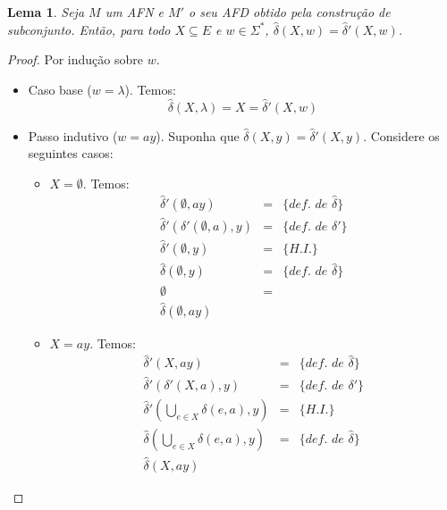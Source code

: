 \documentclass[a4paper]{article}
\newtheorem{Lemma}{Lema}
\theoremstyle{definition}
\begin{document}
  \begin{Lemma}\label{lemma1}
    Seja $M$ um AFN e $M'$ o seu AFD obtido pela construção de subconjunto.
    Então, para todo $X \subseteq E$ e $w \in \Sigma^*$,
    $\widehat{\delta}(X,w) = \widehat{\delta}'(X,w)$.
  \end{Lemma}
  \begin{proof}
    Por indução sobre $w$.
    \begin{itemize}
       \item Caso base ($w = \lambda$). Temos:
         \[\widehat{\delta}(X,\lambda) = X = \widehat{\delta}'(X,w)\]
       \item Passo indutivo ($w = ay$). Suponha que
         $\widehat{\delta}(X,y) = \widehat{\delta}'(X,y)$. Considere os
         seguintes casos:
         \begin{itemize}
            \item $X = \emptyset$. Temos:
              \[
                \begin{array}{lcl}
                  \widehat{\delta}'(\emptyset,ay) & = & \{\textit{def. de }\widehat{\delta}\}\\
                  \widehat{\delta}'(\delta'(\emptyset,a),y) & = & \{\textit{def.
                                                                  de
                                                                  }\delta'\}\\
                  \widehat{\delta}'(\emptyset,y) & = & \{H.I.\}\\
                  \widehat{\delta}(\emptyset,y) & = &\{\textit{def. de
                                                        }\widehat{\delta}\}\\
                  \emptyset & = & \\
                  \widehat{\delta}(\emptyset,ay)
                \end{array}
              \]
            \item $X = ay$. Temos:
              \[
                \begin{array}{lcl}
                  \widehat{\delta}'(X,ay) & = & \{\textit{def. de }\widehat{\delta}\}\\
                  \widehat{\delta}'(\delta'(X,a),y) & = & \{\textit{def. de }\delta'\}\\
                  \widehat{\delta}'(\bigcup_{e\in X}\delta(e,a),y) & = & \{H.I.\}\\
                 \widehat{\delta}(\bigcup_{e\in X}\delta(e,a),y) & = & \{\textit{def. de }\widehat{\delta}\}\\
                 \widehat{\delta}(X,ay)
                \end{array}
              \]
          \end{itemize}
    \end{itemize}
  \end{proof}
\end{document}
